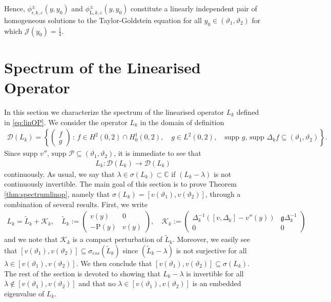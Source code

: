 \documentclass[11pt,reqno]{amsproc}
\theoremstyle{definition}
\numberwithin{equation}{section}
\newcommand{\C}{{\mathbb C}}
\newcommand{\rL}{{\mathrm{L}}}
\newcommand{\cJ}{{\mathcal{J}}}
\newcommand{\sr}{{\mathsf{r}}}
\newcommand{\ep}{\varepsilon}
\newcommand{\g}{{\mathfrak{g}}}
\renewcommand{\P}{{\mathcal{P}}}
\begin{document}
Hence, $\phi_{\sr,k,\ep}^\pm(y,y_0)$ and $\phi_{\rL,k,\ep}^\pm(y,y_0)$ constitute a linearly independent pair of homogeneous solutions to the Taylor-Goldstein equation for all $y_0\in(\vartheta_1,\vartheta_2)$ for which $\cJ(y_0)=\frac14$.


\section{Spectrum of the Linearised Operator}\label{sec:spectrum}
In this section we characterize the spectrum of the linearised operator $L_k$ defined in \eqref{eq:linOP}. We consider the operator $L_k$ in the domain of definition
\begin{align*}
\mathcal{D}(L_k) = \left \lbrace \begin{pmatrix}
f \\ g
\end{pmatrix} \, : \, f\in H^2(0,2)\cap H^1_0(0,2), \quad g\in L^2(0,2), \quad \text{supp } g, \,\text{supp } \Delta_k f \subseteq ( \vartheta_1, \vartheta_2) \right\rbrace.
\end{align*}
Since $\text{supp }v'', \, \text{supp }\P \subseteq (\vartheta_1, \vartheta_2)$, it is immediate to see that
\begin{align*}
L_k: \mathcal{D}(L_k)\rightarrow \mathcal{D}(L_k)
\end{align*}
continuously. As usual, we say that $\lambda\in \sigma(L_k)\subset \C$ if $(L_k-\lambda)$ is not continuously invertible. The main goal of this section is to prove Theorem \ref{thm:spectrumlinop}, namely that $\sigma(L_k) = [v(\vartheta_1),v(\vartheta_2)]$, through a combination of several results. First, we write
\begin{align*}
L_k = \widetilde L_k + \mathcal{K}_k, \quad \widetilde L_k :=\begin{pmatrix}
v(y) & 0 \\
-\mathrm{P}(y) & v(y)
\end{pmatrix}, \quad \mathcal{K}_k := \begin{pmatrix}
\Delta_k^{-1}\left( [v,\Delta_k] - v''(y) \right) & \g\Delta_k^{-1} \\
0 & 0 
\end{pmatrix}
\end{align*}
{and we note that $\mathcal{K}_k$ is a compact perturbation of $\widetilde L_k$. Moreover, we easily see that $[v(\vartheta_1),v(\vartheta_2)]\subseteq\sigma_{ess}(\widetilde L_k)$ since $(\widetilde L_k-\lambda)$ is not surjective for all $\lambda\in [v(\vartheta_1),v(\vartheta_2)]$. We then conclude that $[v(\vartheta_1),v(\vartheta_2)]\subseteq \sigma(L_k)$. The rest of the section is devoted to showing that $L_k-\lambda$ is invertible for all $\lambda\not \in [v(\vartheta_1),v(\vartheta_2)]$ and that no $\lambda \in [v(\vartheta_1),v(\vartheta_2)]$ is an embedded eigenvalue of $L_k$}.
\end{document}
